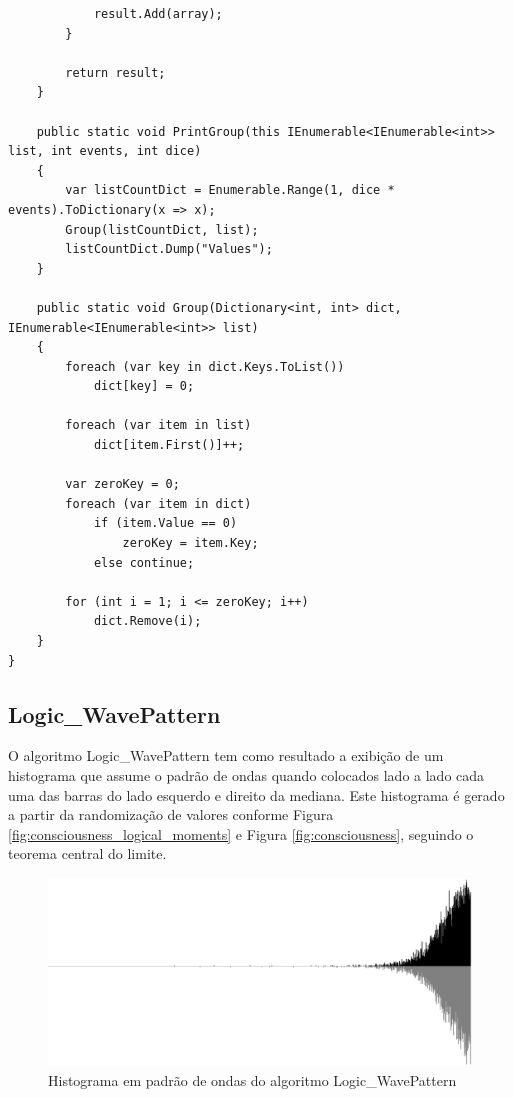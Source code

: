 \begin{apendicesenv}
\begin{lstlisting}
            result.Add(array);
        }

        return result;
    }
    
    public static void PrintGroup(this IEnumerable<IEnumerable<int>> list, int events, int dice)
    {
        var listCountDict = Enumerable.Range(1, dice * events).ToDictionary(x => x);
        Group(listCountDict, list);
        listCountDict.Dump("Values");
    }

    public static void Group(Dictionary<int, int> dict, IEnumerable<IEnumerable<int>> list)
    {
        foreach (var key in dict.Keys.ToList())
            dict[key] = 0;

        foreach (var item in list)
            dict[item.First()]++;

        var zeroKey = 0;
        foreach (var item in dict)
            if (item.Value == 0) 
                zeroKey = item.Key;
            else continue;

        for (int i = 1; i <= zeroKey; i++)
            dict.Remove(i);
    }
}

\end{lstlisting}


\bigbreak \bigbreak
\subsection*{Logic\_WavePattern}
O algoritmo Logic\_WavePattern tem como resultado a exibição de um histograma que assume o padrão de ondas quando colocados lado a lado cada uma das barras do lado esquerdo e direito da mediana. Este histograma é gerado a partir da randomização de valores conforme Figura \ref{fig:consciousness_logical_moments} e Figura \ref{fig:consciousness}, seguindo o teorema central do limite.
	\begin{figure}[H]
	\caption{Histograma em padrão de ondas do algoritmo Logic\_WavePattern}
	\label{fig:logic_wavepattern_15000}
	\centering
	\includegraphics[scale=.25]{sections/images/logic_wavepattern_15000.jpg}
	\end{figure}


\end{apendicesenv}
